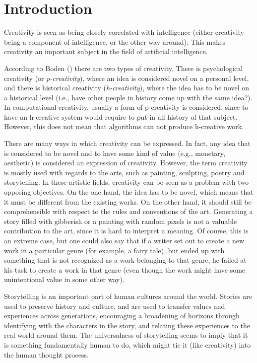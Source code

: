 \section{Introduction}

Creativity is seen as being closely correlated with intelligence (either
creativity being a component of intelligence, or the other way around).
This makes creativity an important subject in the field of artificial
intelligence.

According to Boden (\cite{Boden1998347})
there are two types of creativity. There is psychological creativity (or
\emph{p-creativity}), where an idea is considered novel on a personal level, and
there is historical creativity (\emph{h-creativity}), where the idea has to be
novel on a historical level (i.e., have other people in history come up with the
same idea?).
In computational creativity, usually a form of p-creativity is considered, since
to have an h-creative system would require to put in all history of that
subject. However, this does not mean that algorithms can not produce h-creative
work.

There are many ways in which creativity can be expressed. In fact, any idea that
is considered to be novel and to have some kind of value (e.g., monetary, aesthetic) is
considered an expression of creativity. However, the term creativity is mostly used with regards to
the arts, such as painting, sculpting, poetry and storytelling. In these
artistic fields, creativity can be seen as a problem with two opposing
objectives. On the one hand, the idea has to be novel, which means that it must be different from
the existing works. On the other hand, it should still be comprehensible with
respect to the rules and conventions of the art. Generating a story filled with
gibberish or a painting with random pixels is not a valuable contribution to the
art, since it is hard to interpret a meaning. Of course, this is an extreme
case, but one could also say that if a writer set out to create a new work in a
particular genre (for example, a fairy tale), but ended up with something that
is not recognized as a work belonging to that genre, he failed at his task to
create a work in that genre (even though the work might have some unintentional
value in some other way).

Storytelling is an important part of human cultures around the world.
Stories are used to preserve history and culture, and are used to transfer values
and experiences across generations, encouraging a broadening of horizons through
identifying with the characters in the story, and relating these experiences to
the real world around them. The universalness of storytelling seems to imply
that it is something fundamentally human to do, which might tie it (like
creativity) into the human thought process.

